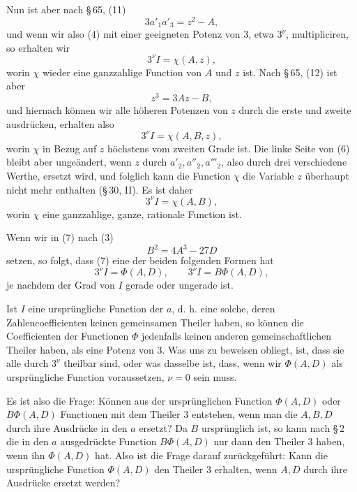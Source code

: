 \documentclass[11pt]{article}
\begin{document}
Nun ist aber nach \S\,65, (11)
\[
 3a'_1a'_3=z^2-A,
\]
und wenn wir also (4) mit einer geeigneten Potenz von $3$, etwa $3^\nu$, multipliciren, so erhalten wir
\begin{equation}
 3^\nu I=\chi(A,z),
\tag{5}
\end{equation}
worin $\chi$ wieder eine ganzzahlige Function von $A$ und $z$ ist. Nach \S\,65, (12) ist aber
\[
 z^3=3Az-B,
\]
und hiernach können wir alle höheren Potenzen von $z$ durch die erste und zweite ausdrücken, erhalten also
\begin{equation}
 3^\nu I=\chi(A,B,z),
\tag{6}
\end{equation}
worin $\chi$ in Bezug auf $z$ höchstens vom zweiten Grade ist. Die linke Seite von (6) bleibt aber ungeändert, wenn $z$ durch $a'_2,a''_2,a'''_2$, also durch drei verschiedene Werthe, ersetzt wird, und folglich kann die Function $\chi$ die Variable $z$ überhaupt nicht mehr enthalten (\S\,30, II). Es ist daher
\begin{equation}
 3^\nu I=\chi(A,B),
\tag{7}
\end{equation}
worin $\chi$ eine ganzzahlige, ganze, rationale Function ist.

Wenn wir in (7) nach (3)
\[
 B^2=4A^3-27D
\]
setzen, so folgt, dass (7) eine der beiden folgenden Formen hat
\begin{equation}
 3^\nu I=\Phi(A,D),
 \qquad
 3^\nu I=B\Phi(A,D),
\tag{8}
\end{equation}
je nachdem der Grad von $I$ gerade oder ungerade ist.

Ist $I$ eine ursprüngliche Function der $a$, d. h. eine solche, deren Zahlencoefficienten keinen gemeinsamen Theiler haben, so können die Coefficienten der Functionen $\Phi$ jedenfalls keinen anderen gemeinschaftlichen Theiler haben, als eine Potenz von $3$. Was uns zu beweisen obliegt, ist, dass sie alle durch $3^\nu$ theilbar sind, oder was dasselbe ist, dass, wenn wir $\Phi(A,D)$ als ursprüngliche Function voraussetzen, $\nu=0$ sein muss.

Es ist also die Frage: Können aus der ursprünglichen Function $\Phi(A,D)$ oder $B\Phi(A,D)$ Functionen mit dem Theiler $3$ entstehen, wenn man die $A,B,D$ durch ihre Ausdrücke in den $a$ ersetzt? Da $B$ ursprünglich ist, so kann nach \S\,2 die in den $a$ ausgedrückte Function $B\Phi(A,D)$ nur dann den Theiler $3$ haben, wenn ihn $\Phi(A,D)$ hat. Also ist die Frage darauf zurückgeführt: Kann die ursprüngliche Function $\Phi(A,D)$ den Theiler $3$ erhalten, wenn $A,D$ durch ihre Ausdrücke ersetzt werden?
\end{document}
